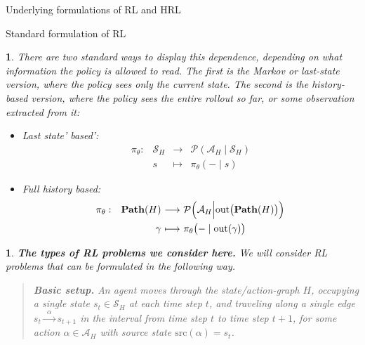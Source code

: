 \documentclass[11pt]{article}
\newtheorem{ermark}[subsubsection]{}
\begin{document}
\begin{section}{Underlying formulations of RL and HRL}
\begin{subsection}{Standard formulation of RL}
\begin{ermark}
There are two standard ways to display this dependence, depending on what information the policy is allowed to read. The first is the Markov or last-state version, where the policy sees only the current state. The second is the history-based version, where the policy sees the entire rollout so far, or some observation extracted from it:
\begin{itemize}
\item
Last state' based':
$$
\begin{array}{rrcl}
\pi_{\theta}:
&\mathcal{S}_{H}
&
\!\!\!\!\longrightarrow\!\!\!\!
&\mathcal{P}(\mathcal{A}_{H}\mid\mathcal{S}_{H}) \\[5pt]
&
s
&
\!\!\!\!\longmapsto\!\!\!\!
& \pi_{\theta}(-\mid s)
\end{array}
$$
\item
Full history based:
$$
\begin{array}{rrcl}
\pi_{\theta}:
&\bold{Path}(H)
&
\!\!\!\!\longrightarrow\!\!\!\!
&\mathcal{P}\Big(\mathcal{A}_{H}\Big|\text{out}\big(\bold{Path}(H)\big)\Big) \\[7pt]
&
\gamma
&
\!\!\!\!\longmapsto\!\!\!\!
& \pi_{\theta}\big(-\mid \text{out}(\gamma)\big)
\end{array}
$$
\end{itemize}
\end{ermark}

\begin{ermark}
\label{remark:my-naive-question}
{\bf The types of RL problems we consider here.}
\normalfont
We will consider RL problems that can be formulated in the following way.

\begin{quote}
{\bf Basic setup.}
An agent moves through the state/action-graph $H$, occupying a single state $s_{t}\in\mathcal{S}_{H}$ at each time step $t$, and traveling along a single edge 
$
s_{t}\xrightarrow{\ \ \alpha\ \ }s_{t+1}
$
in the interval from time step $t$ to time step $t+1$, for some action $\alpha\in\mathcal{A}_{H}$ with source state $\text{src}(\alpha)=s_{t}$.


\end{quote}
\end{ermark}
\end{subsection}
\end{section}
\end{document}
